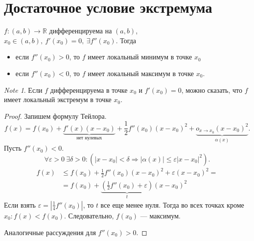 \documentclass[11pt]{book}
\newcommand{\R}{\mathbb{R}}
\renewcommand{\le}{\leqslant}
\theoremstyle{definition}
\theoremstyle{plain}
\theoremstyle{plain}
\theoremstyle{definition}
\theoremstyle{remark}
\newtheorem*{note}{Note}
\begin{document}
\section{Достаточное условие экстремума}
\begin{thm}
    $ f: (a, b) \to  \R$ дифференцируема на $ (a, b)$,  $ x_0 \in (a, b), ~ f'(x_0) = 0, ~ \exists f''(x_0)$. Тогда
    \begin{itemize}
	\item если $ f''(x_0) >0$, то $ f$ имеет локальный минимум в точке $ x_0$
	\item если $ f''(x_0) <0$, то $ f$ имеет локальный максимум в точке $ x_0$.
    \end{itemize}
    \begin{note}
	Если $ f$ дифференцируема в точке $ x_0$ и $ f'(x_0) = 0$, можно сказать, что $ f$ имеет локальный экстремум в точке $ x_0$.
    \end{note}
\end{thm}
\begin{proof}
    Запишем формулу Тейлора.
    \[
	f(x) = f(x_0) + \underbrace{f'(x)(x-x_0)}_{\text{нет нулевых}} + \frac{1}{2}f''(x_0)(x-x_0)^2 + \underbrace{o_{x \to  x_0}(x-x_0)^2}_{\alpha(x)}
    .\] 
    Пусть $ f''(x_0) <0$.
    \[
	\forall \varepsilon >0 ~ \exists \delta >0: \left(|x - x_0| < \delta \Longrightarrow |\alpha(x)| \le \varepsilon |x-x_0|^2\right)
    .\] 
    \[
	\begin{aligned}
	    f(x) & \le f(x_0) + \frac{1}{2}f''(x_0)(x-x_0)^2 + \varepsilon (x-x_0)^2 = \\
		 &= f(x_0) + \underbrace{\left( \frac{1}{2}f''(x_0) + \varepsilon  \right)}_{t} (x-x_0)^2
	\end{aligned}
    \] 
    Если взять $ \varepsilon = \left| \frac{1}{4} f''(x_0) \right| $, то $ t$ все еще менее нуля.
    Тогда во всех точках кроме $ x_0: f(x) < f(x_0)$. Следовательно, $ f(x_0)$ --- максимум.

    Аналогичные рассуждения для $ f''(x_0) > 0$.
\end{proof}
\end{document}

